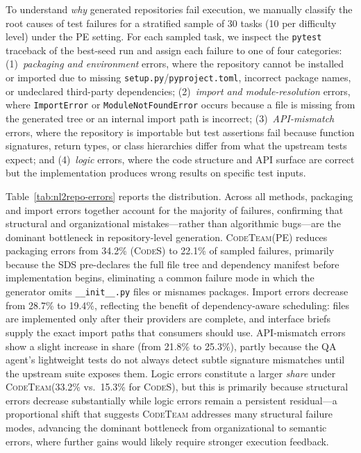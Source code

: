 \documentclass[format=acmsmall, review=false, screen=true]{acmart}
\newcommand{\tool}{\textsc{CodeTeam}\xspace}
\newcommand{\codes}{\textsc{CodeS}\xspace}
\begin{document}
To understand \emph{why} generated repositories fail execution, we manually classify the root causes of test failures for a stratified sample of 30 tasks (10 per difficulty level) under the PE setting.
For each sampled task, we inspect the \texttt{pytest} traceback of the best-seed run and assign each failure to one of four categories: (1)~\emph{packaging and environment} errors, where the repository cannot be installed or imported due to missing \texttt{setup.py}/\texttt{pyproject.toml}, incorrect package names, or undeclared third-party dependencies; (2)~\emph{import and module-resolution} errors, where \texttt{ImportError} or \texttt{ModuleNotFoundError} occurs because a file is missing from the generated tree or an internal import path is incorrect; (3)~\emph{API-mismatch} errors, where the repository is importable but test assertions fail because function signatures, return types, or class hierarchies differ from what the upstream tests expect; and (4)~\emph{logic} errors, where the code structure and API surface are correct but the implementation produces wrong results on specific test inputs.

Table~\ref{tab:nl2repo-errors} reports the distribution.
Across all methods, packaging and import errors together account for the majority of failures, confirming that structural and organizational mistakes---rather than algorithmic bugs---are the dominant bottleneck in repository-level generation.
\tool (PE) reduces packaging errors from 34.2\% (\codes) to 22.1\% of sampled failures, primarily because the SDS pre-declares the full file tree and dependency manifest before implementation begins, eliminating a common failure mode in which the generator omits \texttt{\_\_init\_\_.py} files or misnames packages.
Import errors decrease from 28.7\% to 19.4\%, reflecting the benefit of dependency-aware scheduling: files are implemented only after their providers are complete, and interface briefs supply the exact import paths that consumers should use.
API-mismatch errors show a slight increase in share (from 21.8\% to 25.3\%), partly because the QA agent's lightweight tests do not always detect subtle signature mismatches until the upstream suite exposes them.
Logic errors constitute a larger \emph{share} under \tool (33.2\% vs.\ 15.3\% for \codes), but this is primarily because structural errors decrease substantially while logic errors remain a persistent residual---a proportional shift that suggests \tool addresses many structural failure modes, advancing the dominant bottleneck from organizational to semantic errors, where further gains would likely require stronger execution feedback.
\end{document}
